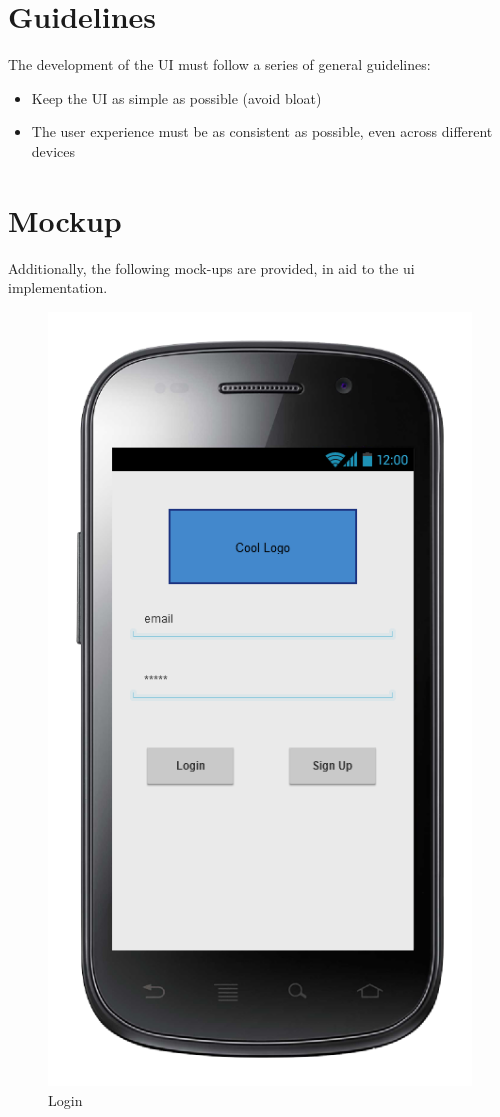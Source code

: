 \section{Guidelines}
The development of the UI must follow a series of general guidelines:
\begin{itemize}
 \item Keep the UI as simple as possible (avoid bloat)
 \item The user experience must be as consistent as possible, even across different devices
\end{itemize}

\section{Mockup}
Additionally, the following mock-ups are provided, in aid to the ui implementation.
\begin{figure} [h]
\centering
  	  \includegraphics[scale=0.5]{../RASD/ui/sequencelogin.png}
\caption{Login}
\end{figure}

